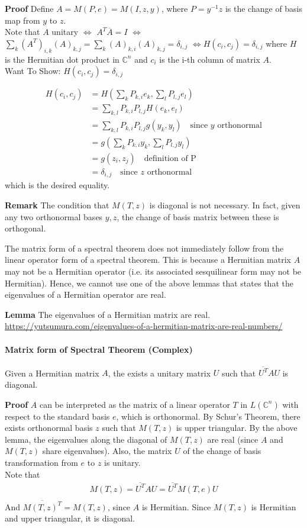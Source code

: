 \documentclass{article}
\begin{document}
\textbf{Proof} Define $A=M(P,e)=M(I,z,y)$, where $P=y^{-1}z$ is the change of basis map from $y$ to $z$.\\
Note that $A$ unitary $\iff$ $A^T\overline{A}=I$ $\iff$ $\sum_k(A^T)_{i,k}(A)_{k,j}=\sum_k (A)_{k,i}(A)_{k,j}=\delta_{i,j}$ $\iff H(c_i,c_j)=\delta_{i,j}$ where $H$ is the Hermitian dot product in $\mathbb{C}^n$ and $c_i$ is the i-th column of matrix $A$.\\
Want To Show: $H(c_i,c_j)=\delta_{i,j}$

\begin{align*}
	H(c_i,c_j) &= H(\sum_k P_{k,i}e_k, \sum_l P_{l,j}e_l) \\
	&= \sum_{k,l} P_{k,i}P_{l,j}H(e_k, e_l) \\
	&= \sum_{k,l} P_{k,i}P_{l,j}g(y_k, y_l) \quad \text{since $y$ orthonormal}\\
	&= g(\sum_k P_{k,i}y_k, \sum_l P_{l,j}y_l) \\
	&= g(z_i, z_j) \quad \text{definition of P}\\
	&= \delta_{i,j} \quad \text{since $z$ orthonormal}
\end{align*}
which is the desired equality.

\textbf{Remark} The condition that $M(T,z)$ is diagonal is not necessary. In fact, given any two orthonormal bases $y,z$, the change of basis matrix between these is orthogonal.


The matrix form of a spectral theorem does not immediately follow from the linear operator form of a spectral theorem. This is because a Hermitian matrix $A$ may not be a Hermitian operator (i.e. its associated sesquilinear form may not be Hermitian). Hence, we cannot use one of the above lemmas that states that the eigenvalues of a Hermitian operator are real.

\textbf{Lemma} The eigenvalues of a Hermitian matrix are real.\\
\url{https://yutsumura.com/eigenvalues-of-a-hermitian-matrix-are-real-numbers/}

\paragraph{Matrix form of Spectral Theorem (Complex)} Given a Hermitian matrix $A$, the exists a unitary matrix $U$ such that $\overline{U^T}AU$ is diagonal.

\textbf{Proof} $A$ can be interpreted as the matrix of a linear operator $T$ in $L(\mathbb{C}^n)$ with respect to the standard basis $e$, which is orthonormal. By Schur's Theorem, there exists orthonormal basis $z$ such that $M(T,z)$ is upper triangular. By the above lemma, the eigenvalues along the diagonal of $M(T,z)$ are real (since $A$ and $M(T,z)$ share eigenvalues). Also, the matrix $U$ of the change of basis transformation from $e$ to $z$ is unitary.\\
Note that 
\begin{align*}
	M(T,z) = \overline{U^T}AU=\overline{U^T}M(T,e)U\\
\end{align*}
And $\overline{M(T,z)^T} = M(T,z)$, since $A$ is Hermitian.
Since $M(T,z)$ is Hermitian and upper triangular, it is diagonal.
\end{document}
